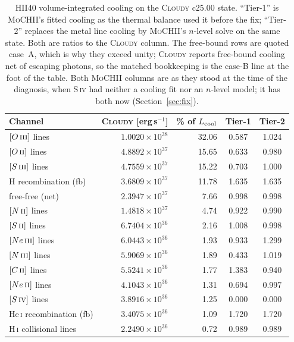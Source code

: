 \documentclass[english,a4paper]{my_memo}
\newcommand{\MoCHII}{\textsc{MoCHII}}
\newcommand{\Cloudy}{\textsc{Cloudy}}
\newcommand{\HI}{H\,\textsc{i}}
\newcommand{\HeI}{He\,\textsc{i}}
\newcommand{\OII}{O\,\textsc{ii}}
\newcommand{\OIII}{O\,\textsc{iii}}
\newcommand{\NII}{N\,\textsc{ii}}
\newcommand{\NIII}{N\,\textsc{iii}}
\newcommand{\CII}{C\,\textsc{ii}}
\newcommand{\SII}{S\,\textsc{ii}}
\newcommand{\SIII}{S\,\textsc{iii}}
\newcommand{\SIV}{S\,\textsc{iv}}
\newcommand{\NeII}{Ne\,\textsc{ii}}
\newcommand{\NeIII}{Ne\,\textsc{iii}}
\begin{document}
\begin{table}[htbp]
\centering
\caption{HII40 volume-integrated cooling on the \Cloudy{} c25.00 state.
``Tier-1'' is \MoCHII{}'s fitted cooling as the thermal balance used it before
the fix; ``Tier-2'' replaces the metal line cooling by \MoCHII{}'s $n$-level
solve on the same state.  Both are ratios to the \Cloudy{} column.  The
free-bound rows are quoted case~A, which is why they exceed unity; \Cloudy{}
reports free-bound cooling net of escaping photons, so the matched bookkeeping
is the case-B line at the foot of the table.  Both \MoCHII{} columns are as
they stood at the time of the diagnosis, when \SIV{} had neither a cooling fit
nor an $n$-level model; it has both now (Section~\ref{sec:fix}).}
\label{tab:budget}
\begin{tabular}{lr@{\hspace{1.5em}}rcc}
\toprule
Channel & \Cloudy{} [erg\,s$^{-1}$] & \% of $L_{\rm cool}$ & Tier-1 & Tier-2 \\
\midrule
$[\OIII{}]$ lines            & $1.0020\times10^{38}$ & 32.06 & 0.587 & 1.024 \\
$[\OII{}]$ lines             & $4.8892\times10^{37}$ & 15.65 & 0.633 & 0.980 \\
$[\SIII{}]$ lines            & $4.7559\times10^{37}$ & 15.22 & 0.703 & 1.000 \\
H recombination (fb)         & $3.6809\times10^{37}$ & 11.78 & 1.635 & 1.635 \\
free-free (net)              & $2.3947\times10^{37}$ &  7.66 & 0.998 & 0.998 \\
$[\NII{}]$ lines             & $1.4818\times10^{37}$ &  4.74 & 0.922 & 0.990 \\
$[\SII{}]$ lines             & $6.7404\times10^{36}$ &  2.16 & 1.008 & 0.998 \\
$[\NeIII{}]$ lines           & $6.0443\times10^{36}$ &  1.93 & 0.933 & 1.299 \\
$[\NIII{}]$ lines            & $5.9069\times10^{36}$ &  1.89 & 0.433 & 1.019 \\
$[\CII{}]$ lines             & $5.5241\times10^{36}$ &  1.77 & 1.383 & 0.940 \\
$[\NeII{}]$ lines            & $4.1043\times10^{36}$ &  1.31 & 0.694 & 0.997 \\
$[\SIV{}]$ lines             & $3.8916\times10^{36}$ &  1.25 & 0.000 & 0.000 \\
\HeI{} recombination (fb)    & $3.4075\times10^{36}$ &  1.09 & 1.720 & 1.720 \\
\HI{} collisional lines      & $2.2490\times10^{36}$ &  0.72 & 0.989 & 0.989 \\

\end{tabular}
\end{table}
\end{document}

